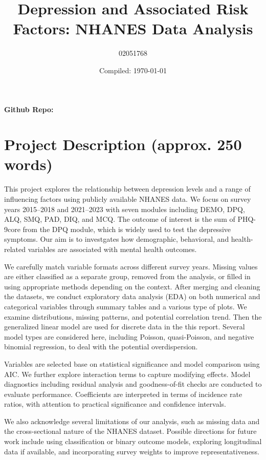 \documentclass[a4paper, 12pt]{article}
\title{Depression and Associated Risk Factors: NHANES Data Analysis}
\author{02051768}
\date{Compiled: \today}
\begin{document}
\maketitle

\textbf{Github Repo:} \href{https://github.com/zakvarty/eds-notes-quarto/releases/tag/v1.2.0-alpha}{\color{blue}{REPLACE-WITH-LINK-TO-YOUR-TAGGED-RELEASE}}

\section{Project Description (approx. 250 words)}


This project explores the relationship between depression levels and a range of influencing factors using publicly available NHANES data. We focus on survey years 2015–2018 and 2021–2023 with seven modules including DEMO, DPQ, ALQ, SMQ, PAD, DIQ, and MCQ. The outcome of interest is the sum of PHQ-9core from the DPQ module, which is widely used to test the depressive symptoms. Our aim is to investgates how demographic, behavioral, and health-related variables are associated with mental health outcomes.

We carefully match variable formats across different survey years. Missing values are either classified as a separate group, removed from the analysis, or filled in using appropriate methods depending on the context. After merging and cleaning the datasets, we conduct exploratory data analysis (EDA) on both numerical and categorical variables through summary tables and a various type of plots. We examine distributions, missing patterns, and potential correlation trend. Then the generalized linear model are used for discrete data in the this report. Several model types are considered here, including Poisson, quasi-Poisson, and negative binomial regression, to deal with the potential overdispersion.

Variables are selected base on statistical significance and model comparison using AIC. We further explore interaction terms to capture modifying effects. Model diagnostics including residual analysis and goodness-of-fit checks are conducted to evaluate performance. Coefficients are interpreted in terms of incidence rate ratios, with attention to practical significance and confidence intervals.

We also acknowledge several limitations of our analysis, such as missing data and the cross-sectional nature of the NHANES dataset. Possible directions for future work include using classification or binary outcome models, exploring longitudinal data if available, and incorporating survey weights to improve representativeness.
\end{document}
